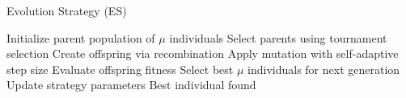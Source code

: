 \documentclass{article}
\begin{document}
\begin{algorithm}
\caption{Evolution Strategy (ES)}
\begin{algorithmic}[1]
\State Initialize parent population of $\mu$ individuals
        \State Select parents using tournament selection
        \State Create offspring via recombination
        \State Apply mutation with self-adaptive step size
        \State Evaluate offspring fitness
    \EndFor
    \State Select best $\mu$ individuals for next generation
    \State Update strategy parameters
\EndWhile
\State \Return Best individual found
\end{algorithmic}
\end{algorithm}
\end{document}
